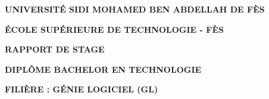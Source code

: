 \documentclass[12pt,a4paper]{report}
\begin{document}
\begin{titlepage}
    \centering
    
    {\fontsize{18}{22}\bfseries UNIVERSITÉ SIDI MOHAMED BEN ABDELLAH DE FÈS\par}
    \vspace{0.5cm}
    {\fontsize{16}{20}\bfseries ÉCOLE SUPÉRIEURE DE TECHNOLOGIE - FÈS\par}
    
    \vspace{1.5cm}
    
    {\fontsize{26}{32}\bfseries RAPPORT DE STAGE\par}
    \vspace{1.5cm}
    
    {\fontsize{14}{17}\bfseries DIPLÔME BACHELOR EN TECHNOLOGIE\par}
    \vspace{0.5cm}
    {\fontsize{14}{17}\bfseries FILIÈRE : GÉNIE LOGICIEL (GL)\par}
    
    \vspace{2cm}
    
    \begin{center}
    \end{center}
    

\end{titlepage}
\end{document}
